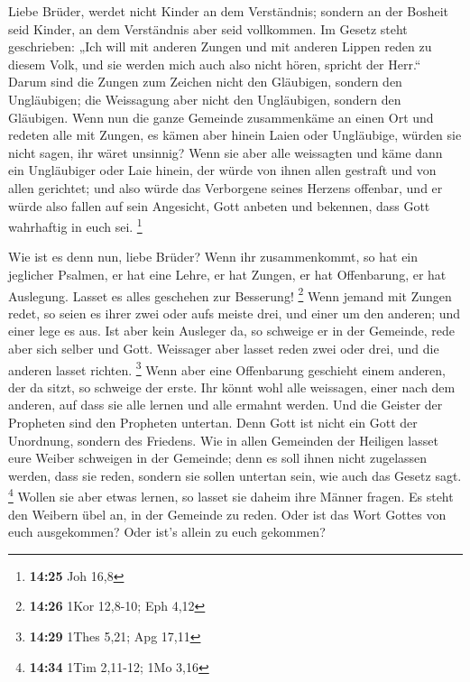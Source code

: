  Liebe Brüder, werdet nicht Kinder an dem Verständnis;
sondern an der Bosheit seid Kinder, an dem Verständnis aber seid
vollkommen.  Im Gesetz steht geschrieben: „Ich will mit
anderen Zungen und mit anderen Lippen reden zu diesem Volk, und sie
werden mich auch also nicht hören, spricht der Herr.`` 
Darum sind die Zungen zum Zeichen nicht den Gläubigen, sondern den
Ungläubigen; die Weissagung aber nicht den Ungläubigen, sondern den
Gläubigen.  Wenn nun die ganze Gemeinde zusammenkäme an
einen Ort und redeten alle mit Zungen, es kämen aber hinein Laien oder
Ungläubige, würden sie nicht sagen, ihr wäret unsinnig? 
Wenn sie aber alle weissagten und käme dann ein Ungläubiger oder Laie
hinein, der würde von ihnen allen gestraft und von allen gerichtet;
 und also würde das Verborgene seines Herzens offenbar,
und er würde also fallen auf sein Angesicht, Gott anbeten und bekennen,
dass Gott wahrhaftig in euch sei. \footnote{\textbf{14:25} Joh 16,8}

 Wie ist es denn nun, liebe Brüder? Wenn ihr
zusammenkommt, so hat ein jeglicher Psalmen, er hat eine Lehre, er hat
Zungen, er hat Offenbarung, er hat Auslegung. Lasset es alles geschehen
zur Besserung! \footnote{\textbf{14:26} 1Kor 12,8-10; Eph 4,12}
 Wenn jemand mit Zungen redet, so seien es ihrer zwei
oder aufs meiste drei, und einer um den anderen; und einer lege es aus.
 Ist aber kein Ausleger da, so schweige er in der
Gemeinde, rede aber sich selber und Gott.  Weissager aber
lasset reden zwei oder drei, und die anderen lasset richten. \footnote{\textbf{14:29}
  1Thes 5,21; Apg 17,11}  Wenn aber eine Offenbarung
geschieht einem anderen, der da sitzt, so schweige der erste.
 Ihr könnt wohl alle weissagen, einer nach dem anderen,
auf dass sie alle lernen und alle ermahnt werden.  Und
die Geister der Propheten sind den Propheten untertan. 
Denn Gott ist nicht ein Gott der Unordnung, sondern des Friedens.
 Wie in allen Gemeinden der Heiligen lasset eure Weiber
schweigen in der Gemeinde; denn es soll ihnen nicht zugelassen werden,
dass sie reden, sondern sie sollen untertan sein, wie auch das Gesetz
sagt. \footnote{\textbf{14:34} 1Tim 2,11-12; 1Mo 3,16} 
Wollen sie aber etwas lernen, so lasset sie daheim ihre Männer fragen.
Es steht den Weibern übel an, in der Gemeinde zu reden. 
Oder ist das Wort Gottes von euch ausgekommen? Oder ist's allein zu euch
gekommen?

